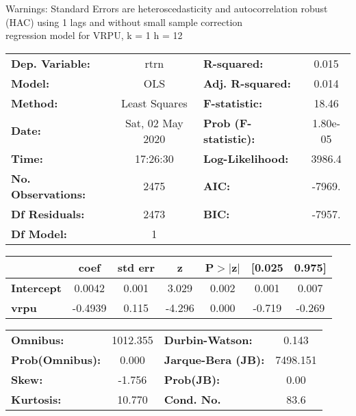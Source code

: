 Warnings: \newline
 [1] Standard Errors are heteroscedasticity and autocorrelation robust (HAC) using 1 lags and without small sample correction\\ 

regression model for VRPU, k = 1 h = 12\begin{center}
\begin{tabular}{lclc}
\toprule
\textbf{Dep. Variable:}    &       rtrn       & \textbf{  R-squared:         } &     0.015   \\
\textbf{Model:}            &       OLS        & \textbf{  Adj. R-squared:    } &     0.014   \\
\textbf{Method:}           &  Least Squares   & \textbf{  F-statistic:       } &     18.46   \\
\textbf{Date:}             & Sat, 02 May 2020 & \textbf{  Prob (F-statistic):} &  1.80e-05   \\
\textbf{Time:}             &     17:26:30     & \textbf{  Log-Likelihood:    } &    3986.4   \\
\textbf{No. Observations:} &        2475      & \textbf{  AIC:               } &    -7969.   \\
\textbf{Df Residuals:}     &        2473      & \textbf{  BIC:               } &    -7957.   \\
\textbf{Df Model:}         &           1      & \textbf{                     } &             \\
\bottomrule
\end{tabular}
\begin{tabular}{lcccccc}
                   & \textbf{coef} & \textbf{std err} & \textbf{z} & \textbf{P$> |$z$|$} & \textbf{[0.025} & \textbf{0.975]}  \\
\midrule
\textbf{Intercept} &       0.0042  &        0.001     &     3.029  &         0.002        &        0.001    &        0.007     \\
\textbf{vrpu}      &      -0.4939  &        0.115     &    -4.296  &         0.000        &       -0.719    &       -0.269     \\
\bottomrule
\end{tabular}
\begin{tabular}{lclc}
\textbf{Omnibus:}       & 1012.355 & \textbf{  Durbin-Watson:     } &    0.143  \\
\textbf{Prob(Omnibus):} &   0.000  & \textbf{  Jarque-Bera (JB):  } & 7498.151  \\
\textbf{Skew:}          &  -1.756  & \textbf{  Prob(JB):          } &     0.00  \\
\textbf{Kurtosis:}      &  10.770  & \textbf{  Cond. No.          } &     83.6  \\
\bottomrule
\end{tabular}
\end{center}

